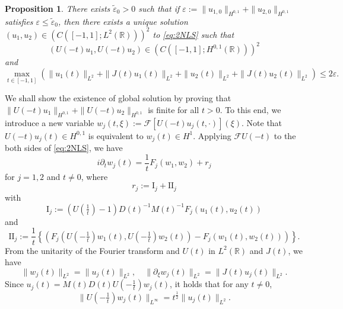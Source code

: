 \documentclass[11pt,a4paper,twosides]{amsart}
\theoremstyle{plain}
\newtheorem{proposition}[theorem]{Proposition}
\theoremstyle{remark}
\numberwithin{equation}{section}
\newcommand{\R}{\mathbb{R}}
\def\le{\leqslant}
\theoremstyle{definition}
\newcommand{\1}{{\bf 1}_{\{|x| < |t|\}}}
\renewcommand{\epsilon}{\varepsilon}
\begin{document}
\begin{proposition}\label{prop:local}
  There exists $\widetilde{\epsilon}_0 > 0$ such that if
  $\epsilon := \|u_{1,0}\|_{H^{0,1}} + \|u_{2,0}\|_{H^{0,1}}$ satisfies
  $\epsilon \le \widetilde{\epsilon}_0$, then there exists
  a unique solution
  $(u_1, u_2) \in (C([-1, 1];L^2(\R)))^2$ to \eqref{eq:2NLS} such that
  \[
 ( U(-t)u_1, U(-t)u_2) \in (C([-1,1];H^{0,1}(\R)))^2
  \]
  and
  \begin{equation}
    \max_{t \in [-1,1]}\left(
    \|u_1(t)\|_{L^2} + \|J(t)u_1(t)\|_{L^2}
    + \|u_2(t)\|_{L^2} + \|J(t)u_2(t)\|_{L^2}
    \right) \le 2\epsilon.
  \end{equation}
\end{proposition}
We shall show the existence of global solution by 
proving that $\|U(-t)u_1\|_{H^{0,1}}+\|U(-t)u_2\|_{H^{0,1}}$ is finite for all $t>0$.
To this end,
 we introduce a new variable
  $w_j(t,\xi) := \mathcal{F}[U(-t)u_j(t,\cdot)](\xi)$.
  Note that $U(-t)u_j(t) \in H^{0,1}$ is equivalent to $w_j(t) \in H^1$.
  Applying $\mathcal{F}U(-t)$ to the both sides of \eqref{eq:2NLS}, we have
  \begin{equation}\label{eq:wsys}
    i\partial_t w_j(t) = \frac{1}{t}F_j(w_1, w_2) + r_j
  \end{equation}
  for $j = 1,2$ and $t \neq 0$, where
  \begin{equation}\label{eq:rj}
    r_j := \textrm{I}_j + \textrm{II}_j
  \end{equation}
  with
  \begin{equation}\label{eq:Ijdef}
    \textrm{I}_j := \left(U\left(\tfrac{1}{t}\right)-1\right)D(t)^{-1}M(t)^{-1}F_j(u_1(t), u_2(t))
  \end{equation}
  and
  \begin{equation}\label{eq:IIjdef}
    \textrm{II}_j :=
    \frac{1}{t}\left\{(F_j\left(U\left(-\tfrac{1}{t}\right)w_1(t),U\left(-\tfrac{1}{t}\right)w_2(t)\right)
    - F_j(w_1(t), w_2(t)))\right\}.
\end{equation}
From the unitarity of the Fourier transform 
and $U(t)$ in $L^2(\R)$ and $J(t)$, we have
  \begin{equation}\label{eq:L2}
    \|w_j(t)\|_{L^2} = \|u_j(t)\|_{L^2}, \quad 
    \|\partial_{\xi} w_j(t)\|_{L^2} = \|J(t)u_j(t)\|_{L^2}.
  \end{equation}
  Since $u_j(t) = M(t)D(t)U(-\frac{1}{t})w_j(t)$, it holds that 
  for any $t\neq0$, 
  \begin{equation}\label{eq:Linfty}
    \|U\left(-\tfrac{1}{t}\right)w_j(t)\|_{L^\infty} 
    = t^{\frac{1}{2}}\|u_j(t)\|_{L^2}.
  \end{equation}
\end{document}
